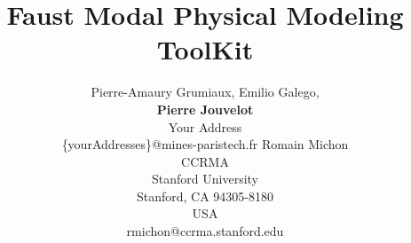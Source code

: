\documentclass[11pt,a4paper]{article}
\title{Faust Modal Physical Modeling ToolKit}
\author
{Pierre-Amaury Grumiaux, Emilio Galego,\\ \textbf{Pierre Jouvelot}
  \\ Your Address
\\ \{yourAddresses\}@mines-paristech.fr 
\And
Romain Michon
\\ CCRMA
\\ Stanford University 
\\ Stanford, CA 94305-8180 
\\ USA
\\ rmichon@ccrma.stanford.edu
}
\newenvironment{contentsmall}{\small}
\begin{document}
\maketitle


\begin{abstract}
  \begin{contentsmall}
  \end{contentsmall}
\end{abstract}

\keywords{
  \begin{contentsmall}
  \end{contentsmall}
}

\section{Introduction}

\section{Conclusions}




\end{document}
